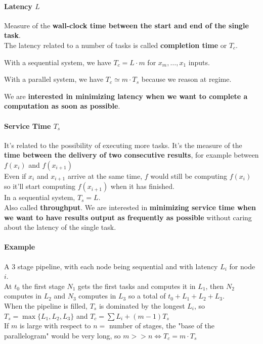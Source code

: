 \documentclass[10pt]{report}
\begin{document}
\paragraph{Latency $L$} Measure of the \textbf{wall-clock time between the start and end of the single task}.\\
The latency related to a number of tasks is called \textbf{completion time} or $T_c$.
\begin{list}{}{}
	\item With a sequential system, we have $T_c = L\cdot m$ for $x_m,\ldots,x_1$ inputs.
	\item With a parallel system, we have $T_c\simeq m\cdot T_s$ because we reason at regime.
\end{list}
We are \textbf{interested in minimizing latency when we want to complete a computation as soon as possible}.
\paragraph{Service Time $T_s$} It's related to the possibility of executing more tasks. It's the measure of the \textbf{time between the delivery of two consecutive results}, for example between $f(x_i)$ and $f(x_{i+1})$\\
Even if $x_i$ and $x_{i+1}$ arrive at the same time, $f$ would still be computing $f(x_i)$ so it'll start computing $f(x_{i+1})$ when it has finished.\\
In a sequential system, $T_s = L$.\\
Also called \textbf{throughput}. We are interested in \textbf{minimizing service time when we want to have results output as frequently as possible} without caring about the latency of the single task.
\paragraph{Example} A 3 stage pipeline, with each node being sequential and with latency $L_i$ for node $i$.\\
At $t_0$ the first stage $N_1$ gets the first tasks and computes it in $L_1$, then $N_2$ computes in $L_2$ and $N_3$ computes in $L_3$ so a total of $t_0 + L_1 + L_2 + L_3$.\\
When the pipeline is filled, $T_s$ is dominated by the longest $L_i$, so $T_s = \max\{L_1, L_2, L_3\}$ and $T_c = \sum L_i + (m-1)T_s$\\
If $m$ is large with respect to $n=$ number of stages, the "base of the parallelogram" would be very long, so $m >> n \Leftrightarrow T_c = m\cdot T_s$
\end{document}

